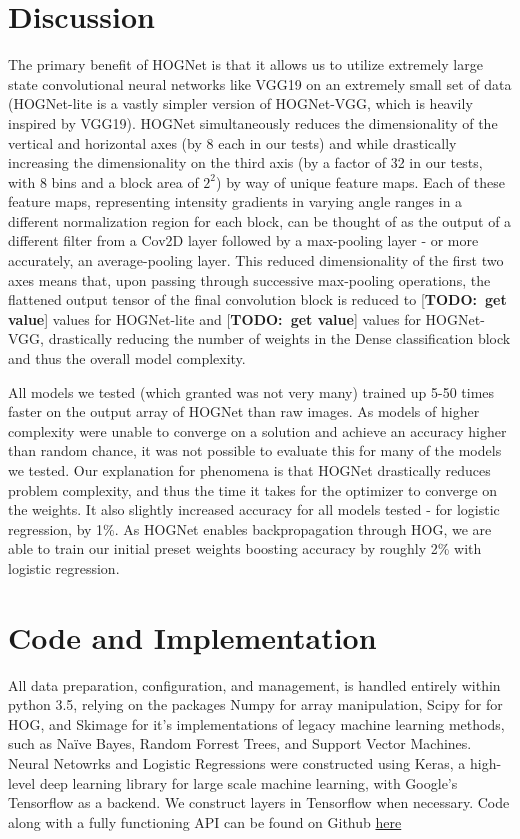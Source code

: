 \documentclass{article}
\newcommand{\todo}[1]{ {\color{red}[{\bf TODO:~{#1}}]}}
\begin{document}
\section{Discussion}

The primary benefit of HOGNet is that it allows us to utilize extremely large state convolutional neural networks like VGG19 on an extremely small set of data (HOGNet-lite is a vastly simpler version of HOGNet-VGG, which is heavily inspired by VGG19). HOGNet simultaneously reduces the dimensionality of the vertical and horizontal axes (by \(8\) each in our tests) and while drastically increasing the dimensionality on the third axis (by a factor of 32 in our tests, with \(8\) bins and a block area of \(2^2\)) by way of unique feature maps. Each of these feature maps, representing intensity gradients in varying angle ranges in a different normalization region for each block, can be thought of as the output of a different filter from a Cov2D layer followed by a max-pooling layer - or more accurately, an average-pooling layer. This reduced dimensionality of the first two axes means that, upon passing through successive max-pooling operations, the flattened output tensor of the final convolution block is reduced to \todo{get value} values for HOGNet-lite and \todo{get value} values for HOGNet-VGG, drastically reducing the number of weights in the Dense classification block and thus the overall model complexity.  
    
All models we tested (which granted was not very many) trained up 5-50 times faster on the output array of HOGNet than raw images. As models of higher complexity were unable to converge on a solution and achieve an accuracy higher than random chance, it was not possible to evaluate this for many of the models we tested. Our explanation for phenomena is that HOGNet drastically reduces problem complexity, and thus the time it takes for the optimizer to converge on the weights. It also slightly increased accuracy for all models tested - for logistic regression, by 1\%. As HOGNet enables backpropagation through HOG, we are able to train our initial preset weights boosting accuracy by roughly 2\% with logistic regression.


\section{Code and Implementation}
 
All data preparation, configuration, and management, is handled entirely within python 3.5, relying on the packages Numpy for array manipulation, Scipy for for HOG, and Skimage for it's implementations of legacy machine learning methods, such as Naïve Bayes, Random Forrest Trees, and Support Vector Machines. Neural Netowrks and Logistic Regressions were constructed using Keras, a high-level deep learning library for large scale machine learning, with Google's Tensorflow as a backend. We construct layers in Tensorflow when necessary. Code along with a fully functioning API can be found on Github \href{https://github.com/MatthewJA/thursday}{here} 
\end{document}
